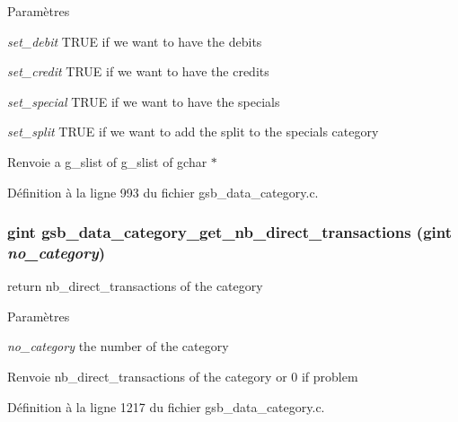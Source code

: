 \begin{DoxyParams}{Paramètres}
\item[{\em set\_\-debit}]TRUE if we want to have the debits \item[{\em set\_\-credit}]TRUE if we want to have the credits \item[{\em set\_\-special}]TRUE if we want to have the specials \item[{\em set\_\-split}]TRUE if we want to add the split to the specials category\end{DoxyParams}
\begin{DoxyReturn}{Renvoie}
a g\_\-slist of g\_\-slist of gchar $\ast$ 
\end{DoxyReturn}


Définition à la ligne 993 du fichier gsb\_\-data\_\-category.c.

\subsubsection[{gsb\_\-data\_\-category\_\-get\_\-nb\_\-direct\_\-transactions}]{\setlength{\rightskip}{0pt plus 5cm}gint gsb\_\-data\_\-category\_\-get\_\-nb\_\-direct\_\-transactions (gint {\em no\_\-category})}\label{gsb__data__category_8h_af73e48e7177061fe93a61a3d2ea8f34c}
return nb\_\-direct\_\-transactions of the category


\begin{DoxyParams}{Paramètres}
\item[{\em no\_\-category}]the number of the category\end{DoxyParams}
\begin{DoxyReturn}{Renvoie}
nb\_\-direct\_\-transactions of the category or 0 if problem 
\end{DoxyReturn}


Définition à la ligne 1217 du fichier gsb\_\-data\_\-category.c.

